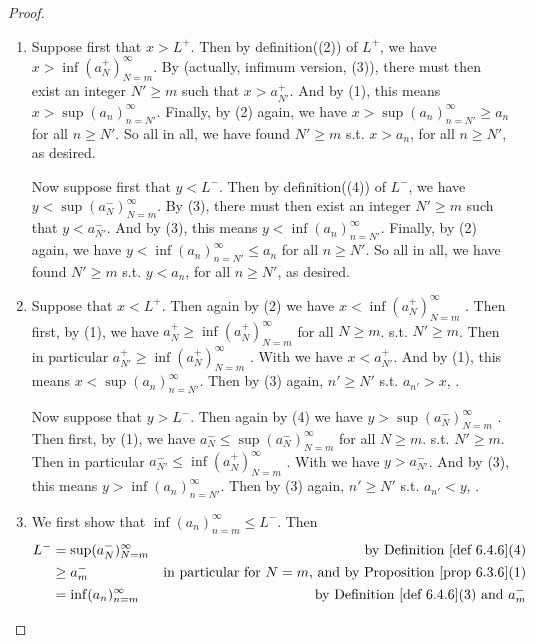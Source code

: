 \begin{proof}
\begin{enumerate}
\item Suppose first that \(x > L^+\).
      Then by definition((2)) of \(L^+\), we have \(x > \inf(a_N^+)_{N = m}^{\infty}\).
      By (actually, infimum version, (3)), there must then exist an integer \(N' \ge m\) such that \(x > a_{N'}^+\).
      And by (1), this means \(x > \sup(a_n)_{n = N'}^{\infty}\).
      Finally, by (2) again, we have \(x > \sup(a_n)_{n = N'}^{\infty} \ge a_n\) for all \(n \ge N'\).
      So all in all, we have found \(N' \ge m\) s.t. \(x > a_n\), for all \(n \ge N'\), as desired.
      
      Now suppose first that \(y < L^-\).
      Then by definition((4)) of \(L^-\), we have \(y < \sup(a_N^-)_{N = m}^{\infty}\).
      By (3), there must then exist an integer \(N' \ge m\) such that \(y < a_{N'}^-\).
      And by (3), this means \(y < \inf(a_n)_{n = N'}^{\infty}\).
      Finally, by (2) again, we have \(y < \inf(a_n)_{n = N'}^{\infty} \le a_n\) for all \(n \ge N'\).
      So all in all, we have found \(N' \ge m\) s.t. \(y < a_n\), for all \(n \ge N'\), as desired.
\item Suppose that \(x < L^+\).
      Then again by (2) we have \(x < \inf(a_N^+)_{N = m}^{\infty}\) .
      Then first, by (1), we have \(a_N^+ \ge \inf(a_N^+)_{N = m}^{\infty}\) for all \(N \ge m\).
       s.t. \(N' \ge m\).
      Then in particular \(a_{N'}^+ \ge \inf(a_N^+)_{N = m}^{\infty}\) .
      With  we have \(x < a_{N'}^+\).
      And by (1), this means \(x < \sup(a_n)_{n = N'}^{\infty}\).
      Then by (3) again,  \(n' \ge N'\) s.t. \(a_{n'} > x\), .
      
      Now suppose that \(y > L^-\).
      Then again by (4) we have \(y > \sup(a_N^-)_{N = m}^{\infty}\) .
      Then first, by (1), we have \(a_N^- \le \sup(a_N^-)_{N = m}^{\infty}\) for all \(N \ge m\).
       s.t. \(N' \ge m\).
      Then in particular \(a_{N'}^- \le \inf(a_N^+)_{N = m}^{\infty}\) .
      With  we have \(y > a_{N'}^-\).
      And by (3), this means \(y > \inf(a_n)_{n = N'}^{\infty}\).
      Then by (3) again,  \(n' \ge N'\) s.t. \(a_{n'} < y\), .
\item We first show that \(\inf(a_n)_{n = m}^{\infty} \le L^-\).
      Then
      \begin{align*}
        L^- & = \sup(a_N^-)_{N = m}^{\infty} & \text{by \DEF{6.4.6}(4)} \\
            & \ge a_m^- & \text{in particular for \(N = m\), and by \PROP{6.3.6}(1)} \\
            & = \inf(a_n)_{n = m}^{\infty} & \text{by \DEF{6.4.6}(3) and \(a_m^-\)}
      \end{align*}
      

\end{enumerate}
\end{proof}
